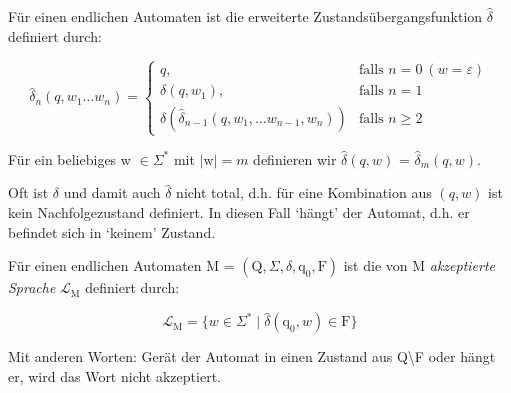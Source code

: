 \documentclass[11pt, a4paper]{article}
\newcommand{\Lagr}{\mathcal{L}}
\begin{document}
\begin{flushleft}
    \begin{tcolorbox}[title = Definition 3.2]
        Für einen endlichen Automaten ist die erweiterte Zustandsübergangsfunktion \(\hat{\delta}\) definiert durch:

        \begin{equation*}
            \hat{\delta}_n(q, w_1 \ldots w_n) = \begin{cases}
                q,                                                      & \text{falls } n = 0\:(w = \varepsilon) \\
                \delta(q, w_1),                                         & \text{falls } n = 1                    \\
                \delta(\hat{\delta}_{n-1}(q, w_1, \ldots w_{n-1}, w_n)) & \text{falls } n \geq 2
            \end{cases}
        \end{equation*}

        Für ein beliebiges w \(\in \Sigma^*\) mit \(|\text{w}| = m\) definieren wir \(\hat{\delta}(q, w)\) = \(\hat{\delta}_m(q, w)\).
    \end{tcolorbox}

    Oft ist \(\delta\) und damit auch \(\hat{\delta}\) nicht total, d.h. für eine Kombination aus \((q, w)\) ist kein Nachfolgezustand definiert. In diesen Fall `hängt' der Automat, d.h. er befindet sich in `keinem' Zustand.

    \begin{tcolorbox}[title = Definition 3.3]
        Für einen endlichen Automaten M = \((\text{Q}, \Sigma, \delta, \text{q}_0, \text{F})\) ist die von M \emph{akzeptierte Sprache} \(\Lagr_\text{M}\) definiert durch:

        \begin{equation*}
            \Lagr_\text{M} = \{w \in \Sigma^* \mid \hat{\delta}(\text{q}_0, w) \in \text{F}\}
        \end{equation*}

        Mit anderen Worten: Gerät der Automat in einen Zustand aus Q\textbackslash F oder hängt er, wird das Wort nicht akzeptiert.



\end{tcolorbox}
\end{flushleft}
\end{document}
